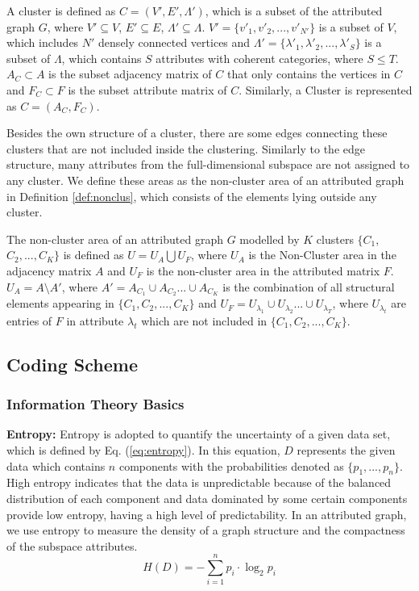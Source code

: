 \begin{definition}\label{def:anclus}
A cluster is defined as $C =(V',E',\Lambda')$, which is a subset of the attributed graph $G$, where $V'\subseteq V$, $E'\subseteq E$, $\Lambda'\subseteq \Lambda$. $V' = \{v'_1, v'_2,...,v'_{N'} \}$ is a subset of $V$, which includes $N'$ densely connected vertices and $\Lambda' = \{\lambda'_1,\lambda'_2,...,\lambda'_S \}$ is a subset of $\Lambda$, which contains $S$ attributes with coherent categories, where $S\leq T$. $A_C \subset A$ is the subset adjacency matrix of $C$ that only contains the vertices in $C$ and $F_C \subset F$ is the subset attribute matrix of $C$. Similarly, a Cluster is represented as $C=(A_C,F_C)$.
\end{definition}

Besides the own structure of a cluster, there are some edges connecting these clusters that are not included inside the clustering. Similarly to the edge structure, many attributes from the full-dimensional subspace are not assigned to any cluster. We define these areas as the non-cluster area of an attributed graph in Definition \ref{def:nonclus}, which consists of the elements lying outside any cluster. 
                                 
\begin{definition}\label{def:nonclus}
The non-cluster area of an attributed graph $G$ modelled by $K$ clusters $\{C_1$, $C_2,...,C_K \}$ is defined as $U = U_A \bigcup U_F $, where $U_A$ is the Non-Cluster area in the adjacency matrix $A$ and $U_F$ is the non-cluster area in the attributed matrix $F$. $U_A=A\setminus A'$, where $A' = A_{C_1}\cup A_{C_2}...\cup A_{C_K}$ is the combination of all structural elements appearing in $\{C_1,C_2,...,C_K \}$ and $U_F = U_{\lambda_1}\cup U_{\lambda_2}...\cup U_{\lambda_T}$, where $U_{\lambda_t}$ are entries of $F$ in attribute $\lambda_t$ which are not included in $\{C_1,C_2,...,C_K \}$.
\end{definition}

\subsection{Coding Scheme}
\subsubsection{Information Theory Basics}
\noindent \textbf{Entropy: } Entropy\cite{entropy} is adopted to quantify the uncertainty of a given data set, which is defined by Eq. (\ref{eq:entropy}). In this equation, $D$ represents the given data which contains $n$ components with the probabilities denoted as $\{p_1,...,p_n\}$. High entropy indicates that the data is unpredictable because of the balanced distribution of each component and data dominated by some certain components provide low entropy, having a high level of predictability. In an attributed graph, we use  entropy to measure the density of a graph structure and the compactness of the subspace attributes. 
\begin{equation}
H(D) = - \sum_{i=1}^n p_i \cdot \log_2 p_i
\label{eq:entropy}
\end{equation}

